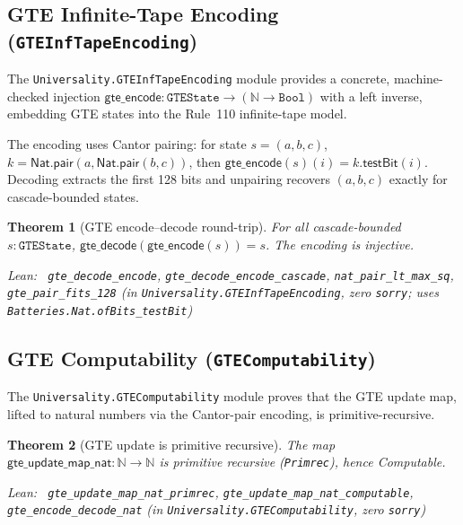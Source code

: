 \documentclass[11pt,a4paper]{article}
\newenvironment{leanref}%
  {\par\smallskip\noindent\begingroup\raggedright\textup{Lean:}~}%
  {\par\endgroup}
\newtheorem{theorem}{Theorem}[section]
\theoremstyle{definition}
\begin{document}
\subsection{GTE Infinite-Tape Encoding (\texttt{GTEInfTapeEncoding})}\label{subsec:gte-inf-tape-encoding}

The \texttt{Universality.GTEInfTapeEncoding} module provides a concrete, machine-checked
injection $\mathsf{gte\_encode} : \mathtt{GTEState} \to (\mathbb{N} \to \mathtt{Bool})$
with a left inverse, embedding GTE states into the Rule~110 infinite-tape model.

The encoding uses Cantor pairing: for state $s = (a,b,c)$,
$k = \mathsf{Nat.pair}(a, \mathsf{Nat.pair}(b,c))$, then
$\mathsf{gte\_encode}(s)(i) = k.\mathsf{testBit}(i)$.
Decoding extracts the first 128 bits and unpairing recovers $(a,b,c)$ exactly for
cascade-bounded states.

\begin{theorem}[GTE encode–decode round-trip]\label{thm:gte-encode-decode}
For all cascade-bounded $s : \mathtt{GTEState}$,
$\mathsf{gte\_decode}(\mathsf{gte\_encode}(s)) = s$.
The encoding is injective.

\begin{leanref}
\lstinline|gte_decode_encode|, \lstinline|gte_decode_encode_cascade|,
\lstinline|nat_pair_lt_max_sq|, \lstinline|gte_pair_fits_128|
\textup{(in \texttt{Universality.GTEInfTapeEncoding}, zero \texttt{sorry};
uses \texttt{Batteries.Nat.ofBits\_testBit})}
\end{leanref}
\end{theorem}

\subsection{GTE Computability (\texttt{GTEComputability})}\label{subsec:gte-computability}

The \texttt{Universality.GTEComputability} module proves that the GTE update map,
lifted to natural numbers via the Cantor-pair encoding, is primitive-recursive.

\begin{theorem}[GTE update is primitive recursive]\label{thm:gte-primrec}
The map $\mathsf{gte\_update\_map\_nat} : \mathbb{N} \to \mathbb{N}$ is primitive
recursive (\texttt{Primrec}), hence Computable.

\begin{leanref}
\lstinline|gte_update_map_nat_primrec|,
\lstinline|gte_update_map_nat_computable|,
\lstinline|gte_encode_decode_nat|
\textup{(in \texttt{Universality.GTEComputability}, zero \texttt{sorry})}
\end{leanref}
\end{theorem}
\end{document}
